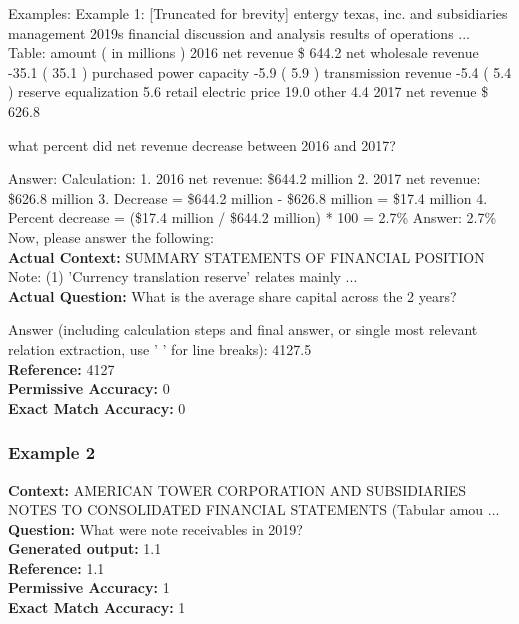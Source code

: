 \documentclass[logo,msc]{infthesis}           %
\begin{document}
Examples:
Example 1: [Truncated for brevity] entergy texas, inc. and subsidiaries management 2019s financial discussion and analysis results of operations ... Table: amount ( in millions ) 2016 net revenue \$ 644.2 net wholesale revenue -35.1 ( 35.1 ) purchased power capacity -5.9 ( 5.9 ) transmission revenue -5.4 ( 5.4 ) reserve equalization 5.6 retail electric price 19.0 other 4.4 2017 net revenue \$ 626.8

what percent did net revenue decrease between 2016 and 2017?

Answer:  Calculation:
1. 2016 net revenue: \$644.2 million
2. 2017 net revenue: \$626.8 million
3. Decrease = \$644.2 million - \$626.8 million = \$17.4 million
4. Percent decrease = (\$17.4 million / \$644.2 million) * 100 = 2.7\%
Answer: 2.7\%
Now, please answer the following:
\\
\textbf{Actual Context:} SUMMARY STATEMENTS OF FINANCIAL POSITION Note: (1) 'Currency translation reserve' relates mainly ...
\\
\textbf{Actual Question:} What is the average share capital across the 2 years?

Answer (including calculation steps and final answer, or single most relevant relation extraction, use '
' for line breaks): 4127.5 
\\
\textbf{Reference:} 4127
\\
\textbf{Permissive Accuracy:} 0
\\
\textbf{Exact Match Accuracy:} 0

\subsubsection{Example 2}
\textbf{Context:} AMERICAN TOWER CORPORATION AND SUBSIDIARIES NOTES TO CONSOLIDATED FINANCIAL STATEMENTS (Tabular amou ...
\\
\textbf{Question:} What were note receivables in 2019?
\\
\textbf{Generated output:} 1.1
\\
\textbf{Reference:} 1.1
\\
\textbf{Permissive Accuracy:} 1
\\
\textbf{Exact Match Accuracy:} 1
\end{document}
